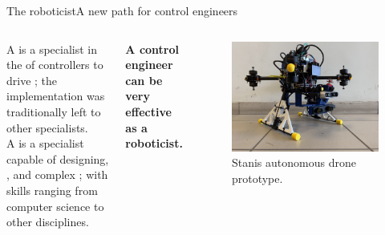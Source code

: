 \begin{frame}{The roboticist}{A new path for control engineers}
	\begin{columns}
		A  is a specialist in the  of controllers to drive ; the implementation was traditionally left to other specialists.\\
		A  is a specialist capable of designing, , and  complex ; with skills ranging from computer science to other disciplines.
		\begin{block}{}
			\centering
			\textbf{A control engineer can be very effective as a roboticist.}
		\end{block}

		\begin{figure}
			\centering
			\includegraphics[width=.8\textwidth]{stanis}
			\caption{Stanis autonomous drone prototype.}
			\label{fig:stanis}
		\end{figure}
	\end{columns}
\end{frame}
